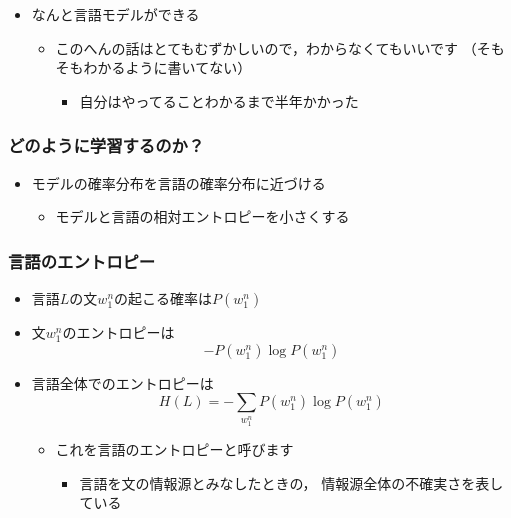 \documentclass[14pt]{beamer}
\begin{document}
\begin{frame}
	\begin{itemize}
		\item なんと言語モデルができる
			\begin{itemize}
				\item このへんの話はとてもむずかしいので，わからなくてもいいです {\tiny （そもそもわかるように書いてない）}
					\begin{itemize}
						\item 自分はやってることわかるまで半年かかった
					\end{itemize}
			\end{itemize}
	\end{itemize}

\end{frame}

\begin{frame}
	\frametitle{どのように学習するのか？}

	\begin{itemize}
		\item モデルの確率分布を言語の確率分布に近づける
			\begin{itemize}
				\item モデルと言語の相対エントロピーを小さくする
			\end{itemize}
	\end{itemize}
\end{frame}

\begin{frame}
	\frametitle{言語のエントロピー}

	\begin{itemize}
		\item 言語$L$の文$w_1^n$の起こる確率は$P(w_1^n)$
		\item 文$w_1^n$のエントロピーは
			\[
				-P(w_1^n) \log P(w_1^n)
			\]
		\item 言語全体でのエントロピーは
			\[
				H(L) = -\sum_{w_1^n}
				P(w_1^n) \log P(w_1^n)
			\]
			\begin{itemize}
				\item これを言語のエントロピーと呼びます
					\begin{itemize}
						\item {\scriptsize
							言語を文の情報源とみなしたときの，
							情報源全体の不確実さを表している}
					\end{itemize}
			\end{itemize}
	\end{itemize}
\end{frame}
\end{document}
